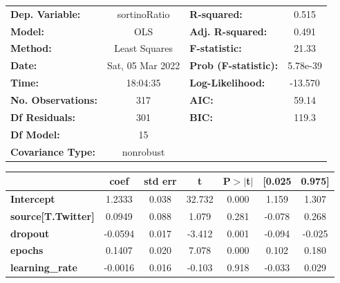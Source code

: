 \begin{center}
\begin{tabular}{lclc}
\toprule
\textbf{Dep. Variable:}              &   sortinoRatio   & \textbf{  R-squared:         } &     0.515   \\
\textbf{Model:}                      &       OLS        & \textbf{  Adj. R-squared:    } &     0.491   \\
\textbf{Method:}                     &  Least Squares   & \textbf{  F-statistic:       } &     21.33   \\
\textbf{Date:}                       & Sat, 05 Mar 2022 & \textbf{  Prob (F-statistic):} &  5.78e-39   \\
\textbf{Time:}                       &     18:04:35     & \textbf{  Log-Likelihood:    } &   -13.570   \\
\textbf{No. Observations:}           &         317      & \textbf{  AIC:               } &     59.14   \\
\textbf{Df Residuals:}               &         301      & \textbf{  BIC:               } &     119.3   \\
\textbf{Df Model:}                   &          15      & \textbf{                     } &             \\
\textbf{Covariance Type:}            &    nonrobust     & \textbf{                     } &             \\
\bottomrule
\end{tabular}
\begin{tabular}{lcccccc}
                                     & \textbf{coef} & \textbf{std err} & \textbf{t} & \textbf{P$> |$t$|$} & \textbf{[0.025} & \textbf{0.975]}  \\
\midrule
\textbf{Intercept}                   &       1.2333  &        0.038     &    32.732  &         0.000        &        1.159    &        1.307     \\
\textbf{source[T.Twitter]}           &       0.0949  &        0.088     &     1.079  &         0.281        &       -0.078    &        0.268     \\
\textbf{dropout}                     &      -0.0594  &        0.017     &    -3.412  &         0.001        &       -0.094    &       -0.025     \\
\textbf{epochs}                      &       0.1407  &        0.020     &     7.078  &         0.000        &        0.102    &        0.180     \\
\textbf{learning\_rate}              &      -0.0016  &        0.016     &    -0.103  &         0.918        &       -0.033    &        0.029     \\

\end{tabular}
\end{center}
